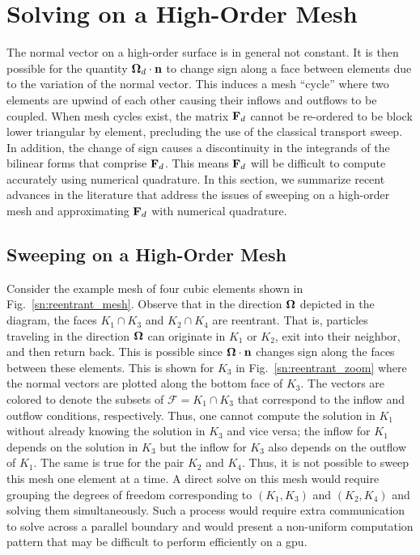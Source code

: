 \documentclass[../doc.tex]{subfiles}
\begin{document}
\section{Solving on a High-Order Mesh} \label{sn_sec:hosweep}
The normal vector on a high-order surface is in general not constant. It is then possible for the quantity $\boldsymbol{\Omega}_d\cdot\boldsymbol{\mathrm{n}}$ to change sign along a face between elements due to the variation of the normal vector. 
This induces a mesh ``cycle'' where two elements are upwind of each other causing their inflows and outflows to be coupled. 
When mesh cycles exist, the matrix $\boldsymbol{\mathrm{F}}_d$ cannot be re-ordered to be block lower triangular by element, precluding the use of the classical transport sweep. 
In addition, the change of sign causes a discontinuity in the integrands of the bilinear forms that comprise $\boldsymbol{\mathrm{F}}_d$. This means $\boldsymbol{\mathrm{F}}_d$ will be difficult to compute accurately using numerical quadrature. In this section, we summarize recent advances in the literature that address the issues of sweeping on a high-order mesh and approximating $\boldsymbol{\mathrm{F}}_d$ with numerical quadrature. 

\subsection{Sweeping on a High-Order Mesh}
Consider the example mesh of four cubic elements shown in Fig.~\ref{sn:reentrant_mesh}. 
Observe that in the direction $\boldsymbol{\Omega}$ depicted in the diagram, the faces $K_1 \cap K_3$ and $K_2 \cap K_4$ are reentrant. That is, particles traveling in the direction $\boldsymbol{\Omega}$ can originate in $K_1$ or $K_2$, exit into their neighbor, and then return back. This is possible since $\boldsymbol{\Omega}\cdot\boldsymbol{\mathrm{n}}$ changes sign along the faces between these elements. This is shown for $K_3$ in Fig.~\ref{sn:reentrant_zoom} where the normal vectors are plotted along the bottom face of $K_3$. The vectors are colored to denote the subsets of $\mathcal{F} = K_1\cap K_3$ that correspond to the inflow and outflow conditions, respectively. Thus, one cannot compute the solution in $K_1$ without already knowing the solution in $K_3$ and vice versa; the inflow for $K_1$ depends on the solution in $K_3$ but the inflow for $K_3$ also depends on the outflow of $K_1$. The same is true for the pair $K_2$ and $K_4$. Thus, it is not possible to sweep this mesh one element at a time. A direct solve on this mesh would require grouping the degrees of freedom corresponding to $(K_1, K_3)$ and $(K_2,K_4)$ and solving them simultaneously. Such a process would require extra communication to solve across a parallel boundary and would present a non-uniform computation pattern that may be difficult to perform efficiently on a \gls{gpu}.  
\end{document}
